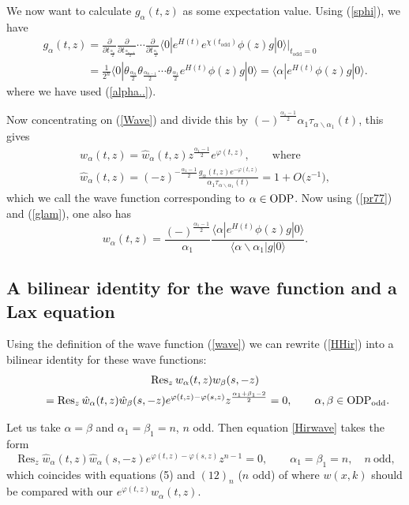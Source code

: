 \documentclass[pdftex]{sigma}
\numberwithin{equation}{section}
\newcommand{\Res}{\mathop\mathrm{Res}\nolimits}
\begin{document}
We now want to calculate $g_\alpha(t,z)$ as some expectation
value. Using (\ref{sphi}), we have
\begin{gather}
g_\alpha(t,z) = \frac{\partial}{\partial t_{\frac{\alpha_n}2}}
\frac{\partial}{\partial t_{\frac{\alpha_{n-1}}2}} \cdots
\frac{\partial}{\partial t_{\frac{\alpha_1}2}}
\langle 0|e^{H(t)}e^{\chi(t_\mathrm{odd})} \phi(z)g|0\rangle\biggr|_{t_\mathrm{odd}=0}\nonumber\\
\phantom{g_\alpha(t,z)}{}  = \frac1{2^n}\langle
0|\theta_{\frac{\alpha_n}{2}}\theta_{\frac{\alpha_{n-1}}{2}}
\cdots
\theta_{\frac{\alpha_{1}}{2}}e^{H(t)} \phi(z)g|0\rangle  =\langle \alpha|e^{H(t)} \phi(z)g|0\rangle  .\label{glam}
\end{gather}
where we have used (\ref{alpha..}).


Now concentrating on (\ref{Wave}) and
 divide this by
 $(-)^{\frac{\alpha_1-1}{2}}\alpha_1\tau_{\alpha\backslash\alpha_1}(t)$, this
 gives
\begin{gather}
w_\alpha(t,z) ={\hat
w}_\alpha(t,z)z^{\frac{\alpha_1-1}{2}}e^{\varphi(t,z)}, \qquad
\mbox{where}\nonumber\\
{\hat w}_\alpha(t,z) =
(-z)^{-\frac{\alpha_1-1}{2}}\frac{g_{\alpha}(t,z)e^{-\varphi(t,z)} }
{\alpha_1\tau_{\alpha\backslash\alpha_1}(t)} =1+O\big(z^{-1}\big),\label{wave}
\end{gather}
which we call the wave function corresponding to $\alpha\in {\rm ODP}$.
Now using (\ref{pr77}) and  (\ref{glam}), one also has
\[
w_\alpha(t,z)=\frac{(-)^{\frac{\alpha_1-1}{2}}}{\alpha_1}
\frac{\langle \alpha|e^{H(t)} \phi(z)g|0\rangle}{\langle
\alpha\backslash \alpha_1|g|0\rangle}.
\]


\subsection{A bilinear identity for the wave function and a Lax equation}

Using the def\/inition of  the wave function (\ref{wave}) we can rewrite   (\ref{HHir}) into
a bilinear identity for these wave functions:
\begin{gather}
\Res_z w_\alpha(t,z)w_\beta(s,-z)\nonumber\\
\qquad{}=\Res_z {\hat
w}_\alpha(t,z){\hat w}_\beta(s,-z)
e^{\varphi(t,z)-\varphi(s,z)}z^{\frac{\alpha_1+\beta_1-2}{2}}=0,
\qquad \alpha,\beta\in {\rm ODP}_\mathrm{odd}.\label{Hirwave}
\end{gather}


Let us take $\alpha=\beta$ and $\alpha_1=\beta_1=n$, $n$ odd. Then equation \eqref{Hirwave} takes the form
 \[
  \Res_z {\hat
w}_\alpha(t,z){\hat w}_\alpha(s,-z)
e^{\varphi(t,z)-\varphi(s,z)}z^{n-1}=0 ,
\qquad  \alpha_1=\beta_1=n ,\quad  n \  \mbox{odd} ,
 \]
which coincides with equations (5) and $(12)_n$ ($n$ odd) of \cite{DJKMVI} where $w(x,k)$ should be compared with our
$e^{\varphi(t,z)}{w}_\alpha(t,z)$.
\end{document}
